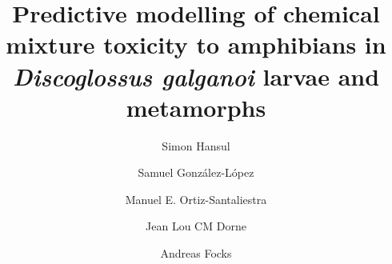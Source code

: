 \documentclass[preprint,12pt]{elsarticle}
\begin{document}
\begin{frontmatter}


\title{
    Predictive modelling of chemical mixture toxicity to amphibians in \textit{Discoglossus galganoi}
    larvae and metamorphs
    }
\author[UOS]{Simon Hansul}
\author[UCLM]{Samuel González-López}
\author[UCLM]{Manuel E. Ortiz-Santaliestra}
\author[EFSA]{Jean Lou CM Dorne}
\author[UOS]{Andreas Focks}
%


\author{} %



\end{frontmatter}
\end{document}
